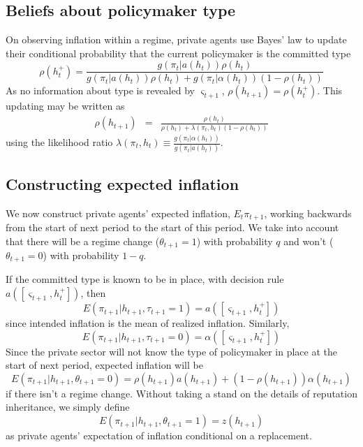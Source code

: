 \documentclass[12pt,letter,leqno]{article}
\theoremstyle{asn}
\theoremstyle{lem}
\theoremstyle{slem}
\theoremstyle{prop}
\theoremstyle{appprop}
\theoremstyle{rem}
\theoremstyle{defn}
\begin{document}
\subsection{Beliefs about policymaker type}\label{appsec:recursive4}

On observing inflation within a regime, private agents use Bayes' law to
update their conditional probability that the current policymaker is the committed
type 
\begin{equation}
\rho (h_{t}^{+}) =\frac{g(\pi _{t}|a(h_{t}))\rho (h_{t})}{g(\pi_{t}|a(h_{t}))\rho (h_{t})+g(\pi _{t}|\alpha (h_{t}))(1-\rho (h_{t}))}
\label{rho update} 
\end{equation}%
As no information about type is revealed by $\varsigma
_{t+1}$, $\rho (h_{t+1})=\rho (h_{t}^{+})$. This updating may be written as
\begin{eqnarray}
\rho (h_{t+1}) &=&\frac{\rho (h_{t})}{\rho (h_{t})+\lambda(\pi _{t},h_{t})(1-\rho (h_{t}))}
\label{rho updateLR} 
\end{eqnarray}%
using the likelihood ratio $\lambda(\pi _{t},h_{t})\equiv\frac{g(\pi
_{t}|\alpha(h_{t}))}{g(\pi _{t}|a(h_{t}))}$.
\subsection{Constructing expected inflation}\label{appsec:recursive5}

We now construct private agents' expected inflation, $E_t\pi _{t+1}$,
working backwards from the start of next period to the start of this period. We take into account that there will be a regime change ($\theta_{t+1}=1$) with probability $q$ and won't ($\theta_{t+1}=0$) with probability $1-q$.

If the committed type is known to be in place, with decision rule $%
a([\varsigma _{t+1},h_{t}^{+}])$, then  
\begin{equation*}
E(\pi _{t+1}|h_{t+1},\tau_{t+1}=1)=a([\varsigma _{t+1},h_{t}^{+}])
\end{equation*}%
since intended inflation is the mean of realized inflation. Similarly,%
\begin{equation*}
E(\pi _{t+1}|h_{t+1},\tau_{t+1}=0)=\alpha ([\varsigma _{t+1},h_{t}^{+}])
\end{equation*}
Since the private sector will not know the type of policymaker in place at the start of next period, expected inflation will be 
\begin{equation}\label{eq:ep1}
E(\pi_{t+1}|h_{t+1},\theta_{t+1}=0)=\rho (h_{t+1})a(h_{t+1})+(1-\rho
(h_{t+1}))\alpha (h_{t+1})
\end{equation}%
if there isn't a regime change.  Without taking a stand on the details of reputation inheritance, we simply
define 
\begin{equation}\label{eq:ep2}
E(\pi_{t+1}|h_{t+1},\theta_{t+1}=1)=z(h_{t+1})
\end{equation}%
as private agents' expectation of inflation conditional on a
replacement. 
\end{document}
